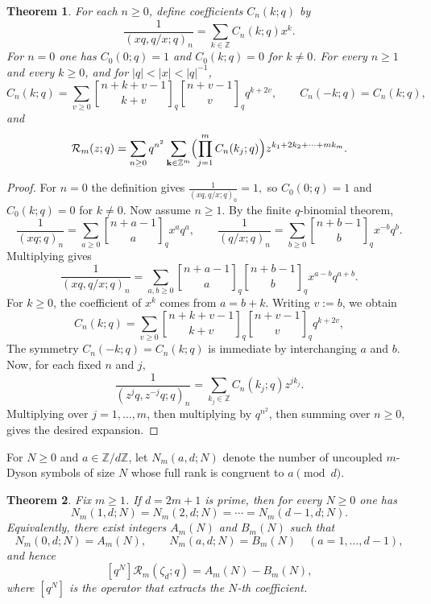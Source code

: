 \documentclass[12pt]{amsart}
\numberwithin{equation}{section}
\newtheorem{theorem}{Theorem}[section]
\newcommand{\ZZ}{\mathbb Z}
\newcommand{\qbinom}[2]{\genfrac{[}{]}{0pt}{}{#1}{#2}_{q}}
\begin{document}
\begin{theorem}
    For each $n\ge 0$, define coefficients $C_n(k;q)$ by
\[
\frac{1}{(xq,q/x;q)_n}=\sum_{k\in\ZZ} C_n(k;q)x^k.
\]
For $n=0$ one has $C_0(0;q)=1$ and $C_0(k;q)=0$ for $k\neq 0$.  For every $n\ge 1$ and every $k\ge 0$, and for $|q|<|x|<|q|^{-1}$,
\[
C_n(k;q)=\sum_{v\ge 0}
\qbinom{n+k+v-1}{k+v}
\qbinom{n+v-1}{v}
q^{k+2v},
\qquad
C_n(-k;q)=C_n(k;q),
\]
and
\[
\mathcal{R}_m(z;q)
=
\sum_{n\ge 0} q^{n^2}
\sum_{\mathbf k\in\ZZ^m}
\Bigl(\prod_{j=1}^m C_n(k_j;q)\Bigr)
 z^{k_1+2k_2+\cdots+mk_m}.
\]
\end{theorem}
\begin{proof}
    For $n=0$ the definition gives
$
\frac{1}{(xq,q/x;q)_0}=1,
$
so $C_0(0;q)=1$ and $C_0(k;q)=0$ for $k\neq 0$.  Now assume $n\ge 1$.  By the finite $q$-binomial theorem,
\[
\frac{1}{(xq;q)_n}=\sum_{a\ge 0}\qbinom{n+a-1}{a}x^a q^a,
\qquad
\frac{1}{(q/x;q)_n}=\sum_{b\ge 0}\qbinom{n+b-1}{b}x^{-b} q^b.
\]
Multiplying gives
\[
\frac{1}{(xq,q/x;q)_n}
=
\sum_{a,b\ge 0}
\qbinom{n+a-1}{a}
\qbinom{n+b-1}{b}
 x^{a-b} q^{a+b}.
\]
For $k\ge 0$, the coefficient of $x^k$ comes from $a=b+k$. Writing $v:=b$, we obtain 
\[
C_n(k;q)=\sum_{v\ge 0}
\qbinom{n+k+v-1}{k+v}
\qbinom{n+v-1}{v}
q^{k+2v},
\]
The symmetry $C_n(-k;q)=C_n(k;q)$ is immediate by interchanging $a$ and $b$.
Now, for each fixed $n$ and $j$,
\[
\frac{1}{(z^jq,z^{-j}q;q)_n}=\sum_{k_j\in\ZZ} C_n(k_j;q)z^{jk_j}.
\]
Multiplying over $j=1,\dots,m$, then multiplying by $q^{n^2}$, then summing over $n\ge 0$, gives the desired expansion.
\end{proof}


For $N\ge 0$ and $a\in\ZZ/d\ZZ$, let $N_m(a,d;N)$ denote the number of uncoupled $m$-Dyson symbols of size $N$ whose full rank is congruent to $a\pmod d$.


\begin{theorem}\label{thm:appendixcongruence}
Fix $m\ge 1$.
If $d=2m+1$ is prime, then for every $N\ge 0$ one has
\[
N_m(1,d;N)=N_m(2,d;N)=\cdots=N_m(d-1,d;N).
\]
Equivalently, there exist integers $A_m(N)$ and $B_m(N)$ such that
\[
N_m(0,d;N)=A_m(N),
\qquad
N_m(a,d;N)=B_m(N)\quad (a=1,\dots,d-1),
\]
and hence 
\[
[q^N]\mathcal{R}_m(\zeta_d;q)=A_m(N)-B_m(N),
\]
where $[q^N]$ is the operator that extracts the $N$-th coefficient.
\end{theorem}
\end{document}

